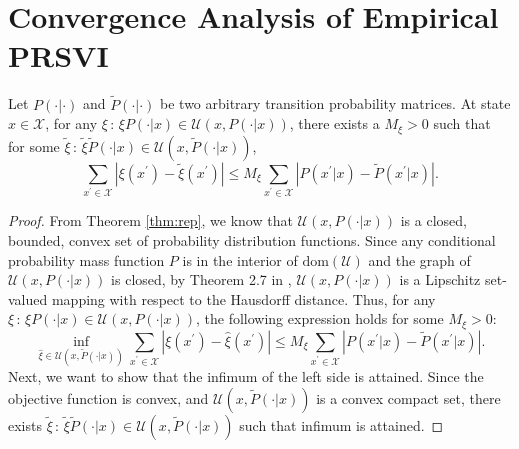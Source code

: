 %


\section{Convergence Analysis of Empirical PRSVI}\label{sec:SAA_VA}

\begin{lemma}\label{lem:tech}
Let $P(\cdot|\cdot)$ and $\widetilde P(\cdot|\cdot)$ be two arbitrary transition probability matrices. At state $x\in\mathcal X$, for any $\xi\,:\,\xi P(\cdot|x)\in\mathcal{U}(x,P(\cdot|x))$, there exists a ${M}_\xi>0$ such that for some $\tilde{\xi}\,:\,\tilde{\xi}\widetilde P(\cdot|x)\in\mathcal{U}(x,\widetilde P(\cdot|x))$,
\[
\sum_{x^\prime\in \mathcal X}|\xi(x^\prime)-\tilde{\xi}(x^\prime)|\leq M_{\xi}\sum_{x^\prime\in \mathcal X}\left|P(x^\prime|x)-\widetilde P(x^\prime|x)\right|.
\]
\end{lemma}
\begin{proof}
From Theorem \ref{thm:rep}, we know that $\mathcal{U}(x,P(\cdot|x))$ is a closed, bounded,  convex set of probability distribution functions. Since any conditional probability mass function $P$ is in the interior of $\text{dom}(\mathcal{U})$ and the graph of $\mathcal{U}(x,P(\cdot|x))$ is closed, by Theorem 2.7 in \citet{rockafellar1998variational}, $\mathcal{U}(x,P(\cdot|x))$ is a Lipschitz set-valued mapping with respect to the Hausdorff distance.
Thus, for any $\xi\,:\,\xi P(\cdot|x)\in\mathcal{U}(x,P(\cdot|x))$, the following expression holds for some ${M}_\xi>0$:
\begin{equation*}
\inf_{\hat{\xi}\in\mathcal{U}(x,\widetilde P(\cdot|x))}\sum_{x^\prime\in \mathcal X}|\xi(x^\prime)-\hat{\xi}(x^\prime)|\leq {M}_\xi\sum_{x^\prime\in \mathcal X}\left| P(x^\prime|x)-\widetilde P(x^\prime|x)\right|.
\end{equation*}
Next, we want to show that the infimum of the left side is attained. Since the objective function is convex, and $\mathcal{U}(x,\widetilde P(\cdot|x))$ is a convex compact set, there exists $\tilde{\xi}\,:\,\tilde{\xi}\widetilde P(\cdot|x)\in\mathcal{U}(x,\widetilde P(\cdot|x))$ such that infimum is attained.
\end{proof}

